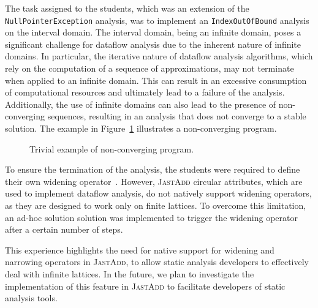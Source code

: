 The task assigned to the students, which was an extension of the \texttt{NullPointerException}
analysis, was to implement an \texttt{IndexOutOfBound} analysis on the interval domain. 
The interval domain, being an infinite domain, poses a significant challenge for
dataflow analysis due to the inherent nature of infinite domains. In particular,
the iterative nature of dataflow analysis algorithms, which rely on the computation
of a sequence of approximations, may not terminate when applied to an infinite domain.
This can result in an excessive consumption of computational resources and ultimately
lead to a failure of the analysis. Additionally, the use of infinite domains can also
lead to the presence of non-converging sequences, resulting in an analysis that does
not converge to a stable solution. The example in Figure~\ref{fig:nonConverging}
illustrates a non-converging program.
\begin{figure}
	\centering
	\caption{\label{fig:nonConverging} Trivial example of non-converging program.}
\end{figure}

To ensure the termination of the analysis, the students were required to 
define their own widening operator~\cite{Bagnara2003Widening}.
However, \textsc{JastAdd} circular attributes, which are used to implement dataflow 
analysis, do not natively support widening operators, as they are designed 
to work only on finite lattices. To overcome this limitation, an ad-hoc solution 
solution was implemented to trigger the widening operator after a certain 
number of steps.

This experience highlights the need for native support for widening and narrowing 
operators in \textsc{JastAdd}, to allow static analysis developers to effectively deal with 
infinite lattices. In the future, we plan to investigate the implementation of this 
feature in \textsc{JastAdd} to facilitate developers of static analysis tools.


